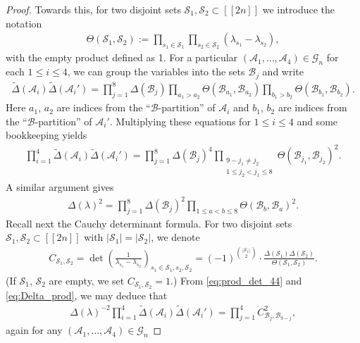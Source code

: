 \documentclass[pdftex]{sigma}
\numberwithin{equation}{section}
\theoremstyle{definition}
\newcommand{\cB}{\mathcal{B}}
\newcommand{\cS}{\mathcal{S}}
\newcommand{\cA}{\mathcal{A}}
\newcommand{\cG}{\mathcal{G}}
\newcommand{\dd}{\Theta}
\newcommand{\lst}[1]{[\![#1 ]\!]}
\newcommand{\wt}[1]{\widetilde{#1}}
\begin{document}
\begin{proof}
Towards this, for two disjoint sets $\cS_1, \cS_2\subset \lst{2n}$ we introduce the notation
\begin{align}\label{eq:defdelta}
 \dd(\cS_1,\cS_2):= \prod_{s_1\in \cS_1} \prod_{s_2\in \cS_2}(\lambda_{s_1}-\lambda_{s_2}),
\end{align}
with the empty product defined as 1.
For a particular $(\cA_1,\dots, \cA_4)\in \cG_n$ for each $1\le i\le 4$, we can group the variables into the sets $\cB_j$ and write
\begin{align*}%
\wt\Delta(\cA_i)\wt\Delta(\cA_i')=\prod_{j=1}^8 \Delta(\cB_j)\prod_{a_1>a_2} \dd(\cB_{a_1}, \cB_{a_2})\prod_{b_1>b_2} \dd(\cB_{b_1}, \cB_{b_2}).
\end{align*}
Here $a_1$, $a_2$ are indices from the ``$\cB$-partition'' of $\cA_i$ and $b_1$, $b_2$ are indices from the ``$\cB$-partition'' of $\cA_i'$. Multiplying these equations for $1\le i\le 4$
and some bookkeeping yields
\begin{align}\label{eq:prod_det_44}
 \prod_{i=1}^4\wt\Delta(\cA_i)\wt\Delta(\cA_i')=\prod_{j=1}^8 \Delta(\cB_j)^4 \prod_{\substack{9- j_1\neq j_2\\1\le j_2< j_1\le 8}} \dd(\cB_{j_1}, \cB_{j_2})^2.
\end{align}
A similar argument gives
\begin{align}\label{eq:Delta_prod}
 \Delta(\lambda)^2=\prod_{j=1}^8 \Delta(\cB_j)^2 \prod_{1\le a<b\le 8} \dd(\cB_b, \cB_a)^2.
\end{align}
Recall next the Cauchy determinant formula. For two disjoint sets $\cS_1, \cS_2\subset \lst{2n}$ with $|\cS_1|=|\cS_2|$,
we denote
\begin{align*}%
 C_{\cS_1,\cS_2}=\det \left(\frac{1}{\lambda_{s_1}-\lambda_{s_2}}\right)_{s_1\in \cS_1, s_2, \cS_2}
 = (-1)^{\binom{|\cS_1|}{2}} \cdot \frac{\Delta(\cS_1)\Delta(\cS_2)}{\dd(\cS_1,\cS_2)}.
\end{align*}
(If $\cS_1$, $\cS_2$ are empty, we set $C_{\cS_1,\cS_2}=1$.)
From \eqref{eq:prod_det_44} and \eqref{eq:Delta_prod}, we
may deduce that
\begin{align}\label{eq:prod_det_4}
 \Delta(\lambda)^{-2} \prod_{i=1}^4\wt\Delta(\cA_i)\wt\Delta(\cA_i')=\prod_{j=1}^4 C_{\cB_j,\cB_{9-j}}^2,
\end{align}
again for any $(\cA_1,\dots, \cA_4)\in \cG_n$


\end{proof}
\end{document}
